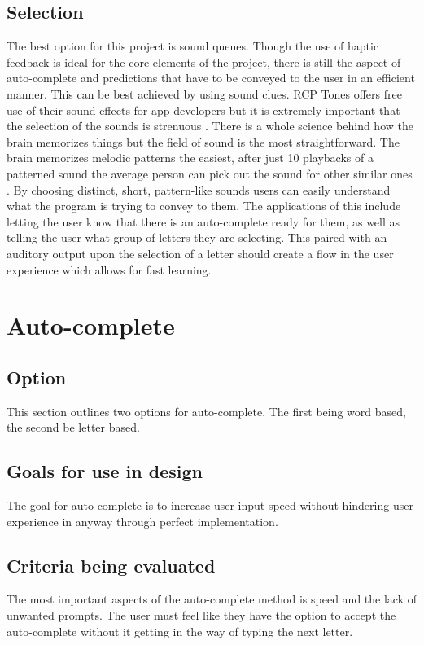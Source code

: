 \documentclass[onecolumn, draftclsnofoot,10pt, journal, letterpaper]{IEEEtran}
\begin{document}
    \subsection{Selection}
        The best option for this project is sound queues. Though the use of haptic feedback is ideal for the core elements of the project, there is still the aspect of auto-complete and predictions that have to be conveyed to the user in an efficient manner. This can be best achieved by using sound clues. RCP Tones offers free use of their sound effects for app developers but it is extremely important that the selection of the sounds is strenuous \cite{RCP}. There is a whole science behind how the brain memorizes things but the field of sound is the most straightforward. The brain memorizes melodic patterns the easiest, after just 10 playbacks of a patterned sound the average person can pick out the sound for other similar ones \cite{Brian}. By choosing distinct, short, pattern-like sounds users can easily understand what the program is trying to convey to them. The applications of this include letting the user know that there is an auto-complete ready for them, as well as telling the user what group of letters they are selecting. This paired with an auditory output upon the selection of a letter should create a flow in the user experience which allows for fast learning.

\section{Auto-complete}

    \subsection{Option}
        This section outlines two options for auto-complete. The first being word based, the second be letter based.
    \subsection{Goals for use in design}
        The goal for auto-complete is to increase user input speed without hindering user experience in anyway through perfect implementation.
    \subsection{Criteria being evaluated }
        The most important aspects of the auto-complete method is speed and the  lack of unwanted prompts. The user must feel like they have the option to accept the auto-complete without it getting in the way of typing the next letter.
\end{document}
